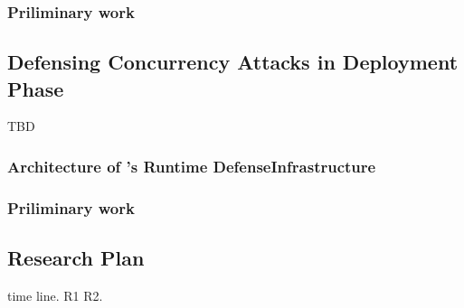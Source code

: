 



 

\subsubsection{Priliminary work}\label{sec:detect-result}


\subsection{Defensing Concurrency Attacks in Deployment Phase} 
\label{sec:defense}

TBD

\subsubsection{Architecture of \xxx's Runtime DefenseInfrastructure} 
\label{sec:defense-arch}




\subsubsection{Priliminary work} \label{sec:defense-result}


\subsection{Research Plan} \label{sec:rep}
time line. R1 R2.


